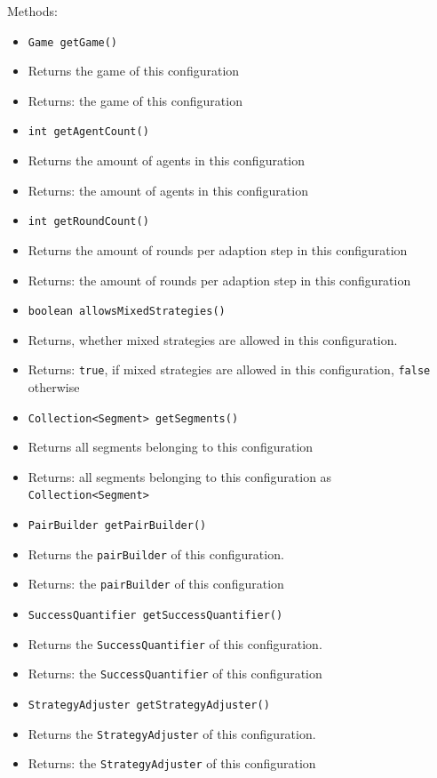 \documentclass[parskip=full,11pt]{scrartcl}
\begin{document}
Methods:
\begin{itemize}\itemsep -10pt
\item \texttt{Game getGame()}
\item[] Returns the game of this configuration
\item[] Returns: the game of this configuration

\item \texttt{int getAgentCount()}
\item[] Returns the amount of agents in this configuration
\item[] Returns: the amount of agents in this configuration

\item \texttt{int getRoundCount()}
\item[] Returns the amount of rounds per adaption step in this configuration
\item[] Returns: the amount of rounds per adaption step in this configuration

\item \texttt{boolean allowsMixedStrategies()}
\item[] Returns, whether mixed strategies are allowed in this configuration.
\item[] Returns: \texttt{true}, if mixed strategies are allowed in this configuration, \texttt{false} otherwise

\item \texttt{Collection<Segment> getSegments()}
\item[] Returns all segments belonging to this configuration
\item[] Returns: all segments belonging to this configuration as \texttt{Collection<Segment>}

\item \texttt{PairBuilder getPairBuilder()}
\item[] Returns the \texttt{pairBuilder} of this configuration.
\item[] Returns: the \texttt{pairBuilder} of this configuration

\item \texttt{SuccessQuantifier getSuccessQuantifier()}
\item[] Returns the \texttt{SuccessQuantifier} of this configuration.
\item[] Returns: the \texttt{SuccessQuantifier} of this configuration

\item \texttt{StrategyAdjuster getStrategyAdjuster()}
\item[] Returns the \texttt{StrategyAdjuster} of this configuration.
\item[] Returns: the \texttt{StrategyAdjuster} of this configuration


\end{itemize}
\end{document}
